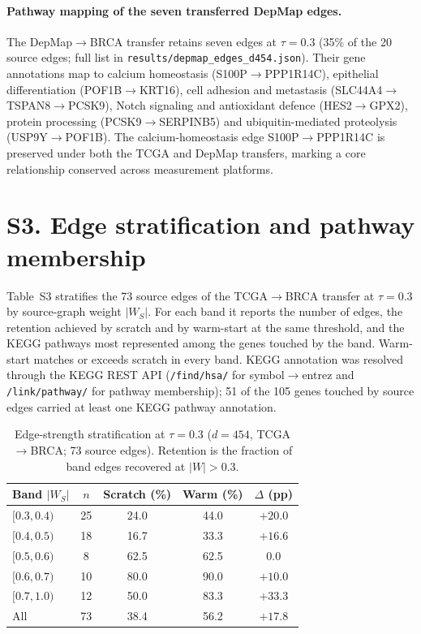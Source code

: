 \documentclass[11pt]{article}
\renewcommand{\to}{\ensuremath{\rightarrow}\allowbreak}
\begin{document}
\paragraph{Pathway mapping of the seven transferred DepMap edges.} The DepMap$\to$BRCA
transfer retains seven edges at $\tau=0.3$ (35\% of the 20 source edges; full list in
\texttt{results/\allowbreak depmap\_edges\_d454.json}). Their gene annotations map to calcium
homeostasis (S100P$\to$PPP1R14C), epithelial differentiation (POF1B$\to$KRT16), cell
adhesion and metastasis (SLC44A4$\to$TSPAN8$\to$PCSK9), Notch signaling and
antioxidant defence (HES2$\to$GPX2), protein processing (PCSK9$\to$SERPINB5) and
ubiquitin-mediated proteolysis (USP9Y$\to$POF1B). The calcium-homeostasis edge
S100P$\to$PPP1R14C is preserved under both the TCGA and DepMap transfers, marking a
core relationship conserved across measurement platforms.

\section*{S3. Edge stratification and pathway membership}

Table~S3 stratifies the 73 source edges of the TCGA$\to$BRCA transfer at
$\tau=0.3$ by source-graph weight $|W_S|$. For each band it reports the number of
edges, the retention achieved by scratch and by warm-start at the same threshold,
and the KEGG pathways most represented among the genes touched by the band.
Warm-start matches or exceeds scratch in every band. KEGG annotation was resolved
through the KEGG REST API (\texttt{/find/hsa/} for symbol$\to$entrez and
\texttt{/link/pathway/} for pathway membership); 51 of the 105 genes touched by
source edges carried at least one KEGG pathway annotation.

\setcounter{table}{2}
\begin{table}[h]
\small
\caption{Edge-strength stratification at $\tau=0.3$ ($d=454$, TCGA$\to$BRCA; 73
source edges). Retention is the fraction of band edges recovered at $|W|>0.3$.}
\begin{tabular}{@{}lcccc@{}}
\toprule
Band $|W_S|$ & $n$ & Scratch (\%) & Warm (\%) & $\Delta$ (pp)\\
\midrule
$[0.3,0.4)$ & 25 & 24.0 & 44.0 & $+20.0$\\
$[0.4,0.5)$ & 18 & 16.7 & 33.3 & $+16.6$\\
$[0.5,0.6)$ & 8 & 62.5 & 62.5 & $0.0$\\
$[0.6,0.7)$ & 10 & 80.0 & 90.0 & $+10.0$\\
$[0.7,1.0)$ & 12 & 50.0 & 83.3 & $+33.3$\\
\midrule
All & 73 & 38.4 & 56.2 & $+17.8$\\
\bottomrule
\end{tabular}
\label{tab:S3}
\end{table}
\end{document}
